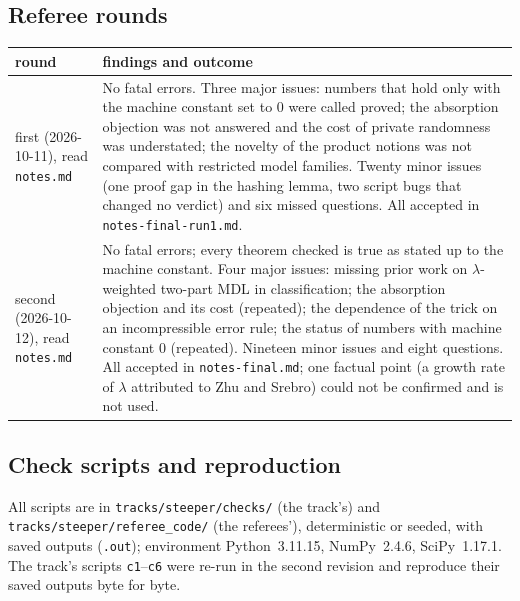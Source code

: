 \subsection{Referee rounds}\label{app:verification:referees}

\begin{center}\small
\begin{tabularx}{\linewidth}{@{}l>{\raggedright\arraybackslash}X@{}}
\toprule
round & findings and outcome\\
\midrule
first (2026-10-11), read \texttt{notes.md} & No fatal errors. Three major issues: numbers that hold only with the machine constant set to $0$ were called proved; the absorption objection was not answered and the cost of private randomness was understated; the novelty of the product notions was not compared with restricted model families. Twenty minor issues (one proof gap in the hashing lemma, two script bugs that changed no verdict) and six missed questions. All accepted in \texttt{notes-final-run1.md}.\\
second (2026-10-12), read \texttt{notes.md} & No fatal errors; every theorem checked is true as stated up to the machine constant. Four major issues: missing prior work on $\lambda$-weighted two-part MDL in classification; the absorption objection and its cost (repeated); the dependence of the trick on an incompressible error rule; the status of numbers with machine constant $0$ (repeated). Nineteen minor issues and eight questions. All accepted in \texttt{notes-final.md}; one factual point (a growth rate of $\lambda$ attributed to Zhu and Srebro) could not be confirmed and is not used.\\
\bottomrule
\end{tabularx}
\end{center}

\subsection{Check scripts and reproduction}\label{app:verification:scripts}

All scripts are in \texttt{tracks/steeper/checks/} (the track's) and \texttt{tracks/steeper/referee\_code/} (the referees'), deterministic or seeded, with saved outputs (\texttt{.out}); environment Python~3.11.15, NumPy~2.4.6, SciPy~1.17.1. The track's scripts \texttt{c1}--\texttt{c6} were re-run in the second revision and reproduce their saved outputs byte for byte.

